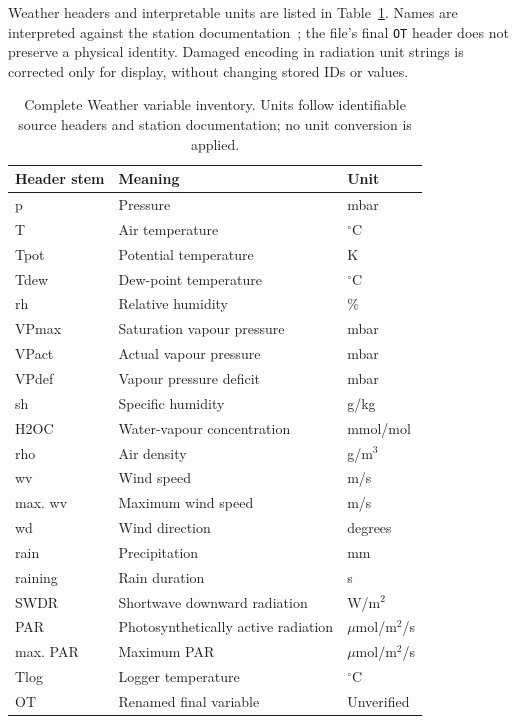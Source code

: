 Weather headers and interpretable units are listed in Table~\ref{tab:weatherunits}. Names are interpreted against the station documentation~\cite{jena_weather}; the file's final \texttt{OT} header does not preserve a physical identity. Damaged encoding in radiation unit strings is corrected only for display, without changing stored IDs or values.
\begin{table}[!htbp]\centering\small
\caption{Complete Weather variable inventory. Units follow identifiable source headers and station documentation; no unit conversion is applied.}\label{tab:weatherunits}
\begin{tabular}{lll}\hline
Header stem & Meaning & Unit \\\hline
p & Pressure & mbar \\
T & Air temperature & $^\circ$C \\
Tpot & Potential temperature & K \\
Tdew & Dew-point temperature & $^\circ$C \\
rh & Relative humidity & \% \\
VPmax & Saturation vapour pressure & mbar \\
VPact & Actual vapour pressure & mbar \\
VPdef & Vapour pressure deficit & mbar \\
sh & Specific humidity & g/kg \\
H2OC & Water-vapour concentration & mmol/mol \\
rho & Air density & g/m$^3$ \\
wv & Wind speed & m/s \\
max. wv & Maximum wind speed & m/s \\
wd & Wind direction & degrees \\
rain & Precipitation & mm \\
raining & Rain duration & s \\
SWDR & Shortwave downward radiation & W/m$^2$ \\
PAR & Photosynthetically active radiation & $\mu$mol/m$^2$/s \\
max. PAR & Maximum PAR & $\mu$mol/m$^2$/s \\
Tlog & Logger temperature & $^\circ$C \\
OT & Renamed final variable & Unverified \\\hline
\end{tabular}\end{table}

